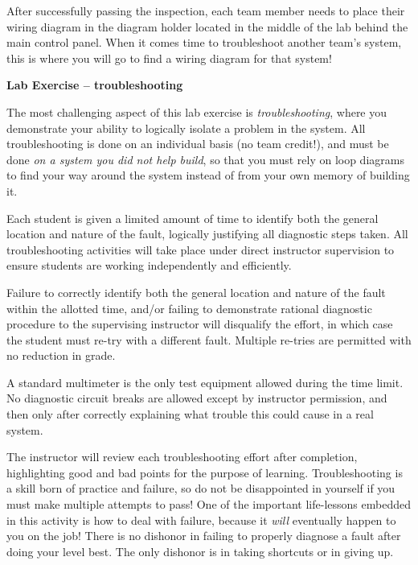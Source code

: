 After successfully passing the inspection, each team member needs to place their wiring diagram in the diagram holder located in the middle of the lab behind the main control panel.  When it comes time to troubleshoot another team's system, this is where you will go to find a wiring diagram for that system!

\vskip 10pt







\vfil \eject

\noindent
{\bf Lab Exercise -- troubleshooting}

\vskip 5pt

The most challenging aspect of this lab exercise is {\it troubleshooting}, where you demonstrate your ability to logically isolate a problem in the system.  All troubleshooting is done on an individual basis (no team credit!), and must be done {\it on a system you did not help build}, so that you must rely on loop diagrams to find your way around the system instead of from your own memory of building it.

Each student is given a limited amount of time to identify both the general location and nature of the fault, logically justifying all diagnostic steps taken.  All troubleshooting activities will take place under direct instructor supervision to ensure students are working independently and efficiently. 

Failure to correctly identify both the general location and nature of the fault within the allotted time, and/or failing to demonstrate rational diagnostic procedure to the supervising instructor will disqualify the effort, in which case the student must re-try with a different fault.  Multiple re-tries are permitted with no reduction in grade.

A standard multimeter is the only test equipment allowed during the time limit.  No diagnostic circuit breaks are allowed except by instructor permission, and then only after correctly explaining what trouble this could cause in a real system.  

The instructor will review each troubleshooting effort after completion, highlighting good and bad points for the purpose of learning.  Troubleshooting is a skill born of practice and failure, so do not be disappointed in yourself if you must make multiple attempts to pass!  One of the important life-lessons embedded in this activity is how to deal with failure, because it {\it will} eventually happen to you on the job!  There is no dishonor in failing to properly diagnose a fault after doing your level best.  The only dishonor is in taking shortcuts or in giving up.

